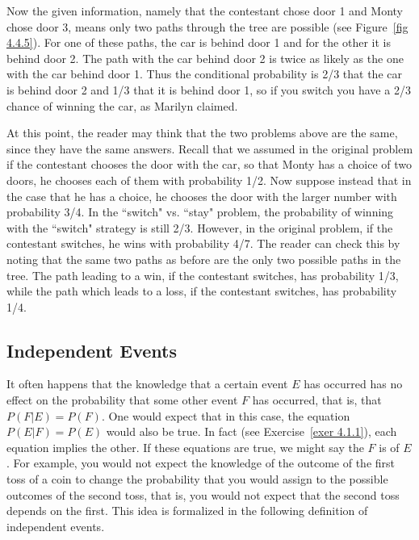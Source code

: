 \begin{example}
\par
Now the given information, namely that the contestant chose door 1 and Monty chose door 3, means
only two paths through the tree are possible (see Figure~\ref{fig 4.4.5}).  
For one of these paths, the car is behind door 1 and for the other it is behind door 2.  
The path with the car behind door 2 is twice as likely as the one with the car behind door 1. 
Thus the conditional probability is 2/3 that the car is behind door 2 and 1/3 that it is 
behind door 1, so if you switch you have a 2/3 chance of winning the car, as Marilyn claimed.
\par
At this point, the reader may think that the two problems above are the same, since they have the
same answers.  Recall that we assumed in the original problem if the contestant
chooses the door with the car, so that Monty has a choice of two doors, he chooses each of them with
probability 1/2.  Now suppose instead that in the case that he has a choice, he chooses the door
with the larger number with probability 3/4.  In the ``switch" vs. ``stay" problem, the
probability of winning with the ``switch" strategy is still 2/3.  However, in
the original problem, if the contestant switches, he wins with probability 4/7.  The reader can
check this by noting that the same two paths as before are the only two possible paths in the tree. 
The path leading to a win, if the contestant switches, has probability 1/3, while the path which
leads to a loss, if the contestant switches, has probability 1/4.
\end{example}


\subsection*{Independent Events}     

It often happens that the knowledge that a certain event $E$ has occurred has no effect on the
probability that some other event $F$ has occurred, that is, that $P(F|E) = P(F)$.  One would
expect that in this case, the equation
$P(E|F) = P(E)$ would also be true.  In fact (see Exercise~\ref{exer 4.1.1}), 
each equation implies the other.  If these equations are true, we might say
the $F$ is  of $E$.  For example, you would not expect the
knowledge of the outcome of the first toss of a coin to change the probability
that you would assign to the possible outcomes of the second toss, that is, you
would not expect that the second toss depends on the first.  This idea is
formalized in the following definition of independent events.

